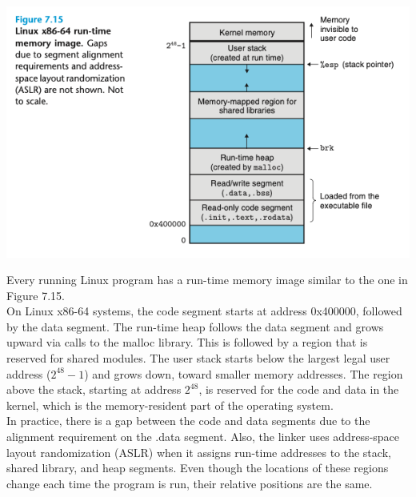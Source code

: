 \documentclass[11pt]{article}
\begin{document}
\begin{center}
\includegraphics[width=.9\linewidth]{pics/figure7.15-run-time-memory.png}
\end{center}

Every running Linux program has a run-time memory image similar to the one in Figure 7.15.\\

On Linux x86-64 systems, the code segment starts at address 0x400000, followed by the data segment. The run-time heap follows the data segment and grows upward via calls to the malloc library. This is followed by a region that is reserved for shared modules. The user stack starts below the largest legal user address (\(2^{48} − 1\)) and grows down, toward smaller memory addresses. The region above the stack, starting at address \(2^{48}\), is reserved for the code and data in the kernel, which is the memory-resident part of the operating system.\\

In practice, there is a gap between the code and data segments due to the alignment requirement on the .data segment. Also, the linker uses address-space layout randomization (ASLR) when it assigns run-time addresses to the stack, shared library, and heap segments. Even though the locations of these regions change each time the program is run, their relative positions are the same.\\
\end{document}
